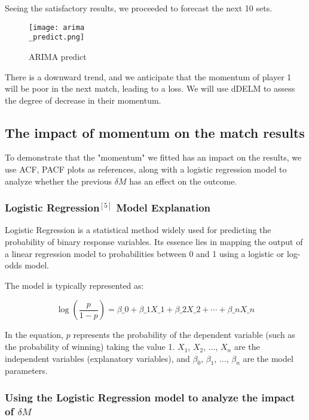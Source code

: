 \documentclass[12pt]{article}
\begin{document}
Seeing the satisfactory results, we proceeded to forecast the next 10 sets.

\begin{figure}[H]
\centering
\texttt{[image: arima\\\_predict.png]}
\caption{ARIMA predict}\label{fig:ariampredict}
\end{figure}

There is a downward trend, and we anticipate that the momentum of player 1 will be poor in the next match, leading to a loss. We will use dDELM to assess the degree of decrease in their momentum.

\subsection{The impact of momentum on the match results}

To demonstrate that the "momentum" we fitted has an impact on the results, we use ACF, PACF plots as references, along with a logistic regression model to analyze whether the previous $\delta M$ has an effect on the outcome.

\subsubsection{Logistic Regression$^{[5]} $ Model Explanation}

Logistic Regression is a statistical method widely used for predicting the probability of binary response variables. Its essence lies in mapping the output of a linear regression model to probabilities between 0 and 1 using a logistic or log-odds model.

The model is typically represented as:

\begin{equation}\label{eq:logistic}
\log\left(\frac{p}{1-p}\right) = \beta\_0 + \beta\_1X\_1 + \beta\_2X\_2 + \cdots + \beta\_nX\_n
\end{equation}

In the equation, $p$  represents the probability of the dependent variable (such as the probability of winning) taking the value 1. $ X_1$, $X_2$, $\ldots$, $X_n $ are the independent variables (explanatory variables), and $ \beta_0$, $\beta_1$, $\ldots$, $\beta_n $ are the model parameters.

\subsubsection{Using the Logistic Regression model to analyze the impact of $\delta M$ }
\end{document}
